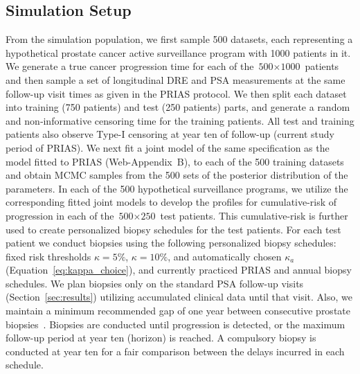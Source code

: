 \subsection{Simulation Setup}
From the simulation population, we first sample 500 datasets, each representing a hypothetical prostate cancer active surveillance program with 1000 patients in it. We generate a true cancer progression time for each of the ${\mbox{500} \times \mbox{1000}}$ patients and then sample a set of longitudinal DRE and PSA measurements at the same follow-up visit times as given in the PRIAS protocol. We then split each dataset into training (750 patients) and test (250 patients) parts, and generate a random and non‐informative censoring time for the training patients. All test and training patients also observe Type-I censoring at year ten of follow-up (current study period of PRIAS). We next fit a joint model of the same specification as the model fitted to PRIAS (Web-Appendix~B), to each of the 500 training datasets and obtain MCMC samples from the 500 sets of the posterior distribution of the parameters. In each of the 500 hypothetical surveillance programs, we utilize the corresponding fitted joint models to develop the profiles for cumulative-risk of progression in each of the ${\mbox{500} \times \mbox{250}}$ test patients. This cumulative-risk is further used to create personalized biopsy schedules for the test patients. For each test patient we conduct biopsies using the following personalized biopsy schedules: fixed risk thresholds $\kappa=5\%$, $\kappa=10\%$, and automatically chosen $\kappa_a$ (Equation~\ref{eq:kappa_choice}), and currently practiced PRIAS and annual biopsy schedules. We plan biopsies only on the standard PSA follow-up visits (Section~\ref{sec:results}) utilizing accumulated clinical data until that visit. Also, we maintain a minimum recommended gap of one year between consecutive prostate biopsies~\citep{bokhorst2015compliance}. Biopsies are conducted until progression is detected, or the maximum follow-up period at year ten (horizon) is reached. A compulsory biopsy is conducted at year ten for a fair comparison between the delays incurred in each schedule.

